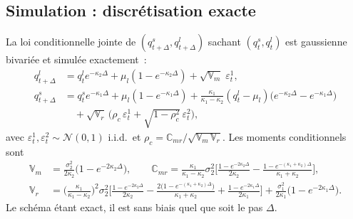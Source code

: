 \documentclass[11pt,a4paper]{article}
\begin{document}
\subsection{Simulation : discrétisation exacte}
\label{sec:exactv2f}
\begin{definitionbox}
La loi conditionnelle jointe de $(q^{s}_{t+\Delta},q^{l}_{t+\Delta})$ sachant $(q^{s}_t,q^{l}_t)$ est gaussienne bivariée et simulée exactement~:
\[
\begin{aligned}
q^{l}_{t+\Delta}&=q^{l}_t e^{-\kappa_2\Delta}+\mu_l(1-e^{-\kappa_2\Delta})+\sqrt{\mathbb V_m}\;\varepsilon^{1}_t,\\
q^{s}_{t+\Delta}&=q^{s}_t e^{-\kappa_1\Delta}+\mu_l(1-e^{-\kappa_1\Delta})+\tfrac{\kappa_1}{\kappa_1-\kappa_2}(q^{l}_t-\mu_l)\big(e^{-\kappa_2\Delta}-e^{-\kappa_1\Delta}\big)\\
&\quad+\sqrt{\mathbb V_r}\,\big(\rho_c\,\varepsilon^{1}_t+\sqrt{1-\rho_c^2}\,\varepsilon^{2}_t\big),
\end{aligned}
\]
avec $\varepsilon^{1}_t,\varepsilon^{2}_t\sim\mathcal N(0,1)$ i.i.d.\ et $\rho_c=\mathbb C_{mr}/\sqrt{\mathbb V_m\,\mathbb V_r}$. Les moments conditionnels sont
{\small
\[
\begin{aligned}
\mathbb V_m&=\tfrac{\sigma_2^2}{2\kappa_2}\big(1-e^{-2\kappa_2\Delta}\big),\qquad
\mathbb C_{mr}=\tfrac{\kappa_1}{\kappa_1-\kappa_2}\sigma_2^2\Big[\tfrac{1-e^{-2\kappa_2\Delta}}{2\kappa_2}-\tfrac{1-e^{-(\kappa_1+\kappa_2)\Delta}}{\kappa_1+\kappa_2}\Big],\\
\mathbb V_r&=\Big(\tfrac{\kappa_1}{\kappa_1-\kappa_2}\Big)^{2}\sigma_2^2\Big[\tfrac{1-e^{-2\kappa_2\Delta}}{2\kappa_2}-\tfrac{2\big(1-e^{-(\kappa_1+\kappa_2)\Delta}\big)}{\kappa_1+\kappa_2}+\tfrac{1-e^{-2\kappa_1\Delta}}{2\kappa_1}\Big]+\tfrac{\sigma_1^2}{2\kappa_1}\big(1-e^{-2\kappa_1\Delta}\big).
\end{aligned}
\]}
Le schéma étant exact, il est sans biais quel que soit le pas $\Delta$.
\end{definitionbox}
\end{document}
